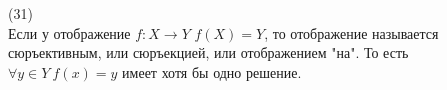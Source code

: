 (31)\\
Если у отображение $f: X \to Y$ $f(X) = Y$, то отображение называется сюръективным, или сюръекцией, или отображением "на". То есть $\forall y \in Y\ f(x) = y$ имеет хотя бы одно решение.